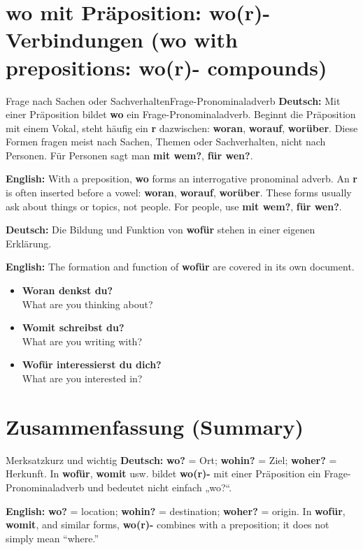 \documentclass[a4paper,11pt]{article}
\newcommand{\GermanText}[1]{\textbf{Deutsch: }#1\par}
\newcommand{\EnglishText}[1]{{\small\color{SoftGray}\textbf{English: }#1\par}}
\newcommand{\ExampleItem}[2]{\item \textbf{#1}\\{\small\color{SoftGray}#2}}
\begin{document}
\section{wo mit Präposition: wo(r)-Verbindungen (wo with prepositions: wo(r)- compounds)}
\begin{grammarentry}{Frage nach Sachen oder Sachverhalten}{Frage-Pronominaladverb}
\GermanText{Mit einer Präposition bildet \textbf{wo} ein Frage-Pronominaladverb. Beginnt die Präposition mit einem Vokal, steht häufig ein \textbf{r} dazwischen: \textbf{woran}, \textbf{worauf}, \textbf{worüber}. Diese Formen fragen meist nach Sachen, Themen oder Sachverhalten, nicht nach Personen. Für Personen sagt man \textbf{mit wem?}, \textbf{für wen?}.}
\EnglishText{With a preposition, \textbf{wo} forms an interrogative pronominal adverb. An \textbf{r} is often inserted before a vowel: \textbf{woran}, \textbf{worauf}, \textbf{worüber}. These forms usually ask about things or topics, not people. For people, use \textbf{mit wem?}, \textbf{für wen?}.}
\GermanText{Die Bildung und Funktion von \textbf{wofür} stehen in einer eigenen Erklärung.}
\EnglishText{The formation and function of \textbf{wofür} are covered in its own document.}
\end{grammarentry}
\begin{exbox}\begin{itemize}
\ExampleItem{Woran denkst du?}{What are you thinking about?}
\ExampleItem{Womit schreibst du?}{What are you writing with?}
\ExampleItem{Wofür interessierst du dich?}{What are you interested in?}
\end{itemize}\end{exbox}

\section{Zusammenfassung (Summary)}
\begin{grammarentry}{Merksatz}{kurz und wichtig}
\GermanText{\textbf{wo?} = Ort; \textbf{wohin?} = Ziel; \textbf{woher?} = Herkunft. In \textbf{wofür}, \textbf{womit} usw. bildet \textbf{wo(r)-} mit einer Präposition ein Frage-Pronominaladverb und bedeutet nicht einfach „wo?“.}
\EnglishText{\textbf{wo?} = location; \textbf{wohin?} = destination; \textbf{woher?} = origin. In \textbf{wofür}, \textbf{womit}, and similar forms, \textbf{wo(r)-} combines with a preposition; it does not simply mean “where.”}
\end{grammarentry}
\end{document}
